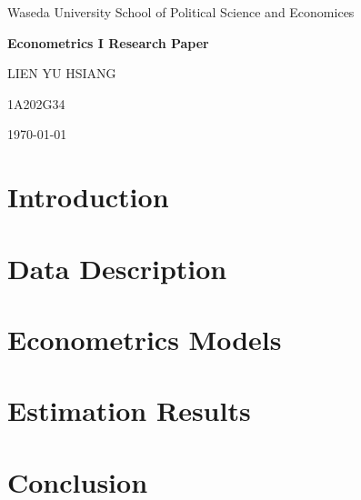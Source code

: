\documentclass{article}
\begin{document}
\begin{titlepage}
    \centering
    \vspace*{5cm}
    {\Large Waseda University School of Political Science and Economices}\par
    \vspace{1cm}
    {\LARGE \textbf{Econometrics I Research Paper}}\par
    \vspace{1cm}
    {\Large LIEN YU HSIANG}\par
    \vspace{1cm}
    {\Large 1A202G34}\par
    \vspace{1cm}
    {\Large \today}\par
    \vspace{2cm}
\end{titlepage}

\section{Introduction}
\section{Data Description}
\section{Econometrics Models}
\section{Estimation Results}
\section{Conclusion}
\end{document}
